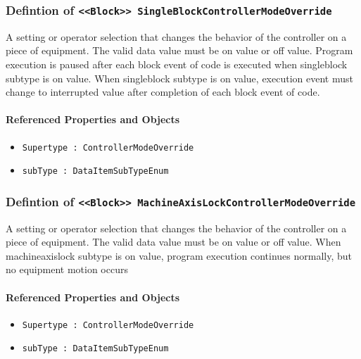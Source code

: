 \subsubsection{Defintion of \texttt{<<Block>> SingleBlockControllerModeOverride}}
  \label{type:SingleBlockControllerModeOverride}

\FloatBarrier

A setting or operator selection that changes the behavior of the controller on a piece of equipment. 
 The valid data value must be on value or off value.
 Program execution is paused after each block event of code is executed when singleblock subtype is on value.   
 When singleblock subtype is on value, execution event must change to interrupted value after completion of each block event of code. 

\FloatBarrier
\paragraph{Referenced Properties and Objects}

\begin{itemize}
\item \texttt{Supertype : ControllerModeOverride}

\item \texttt{subType : DataItemSubTypeEnum}

\end{itemize}
\FloatBarrier
\subsubsection{Defintion of \texttt{<<Block>> MachineAxisLockControllerModeOverride}}
  \label{type:MachineAxisLockControllerModeOverride}

\FloatBarrier

A setting or operator selection that changes the behavior of the controller on a piece of equipment. 
 The valid data value must be on value or off value. 
 When machineaxislock subtype is on value, program execution continues normally, but no equipment motion occurs 

\FloatBarrier
\paragraph{Referenced Properties and Objects}

\begin{itemize}
\item \texttt{Supertype : ControllerModeOverride}

\item \texttt{subType : DataItemSubTypeEnum}

\end{itemize}
\FloatBarrier
